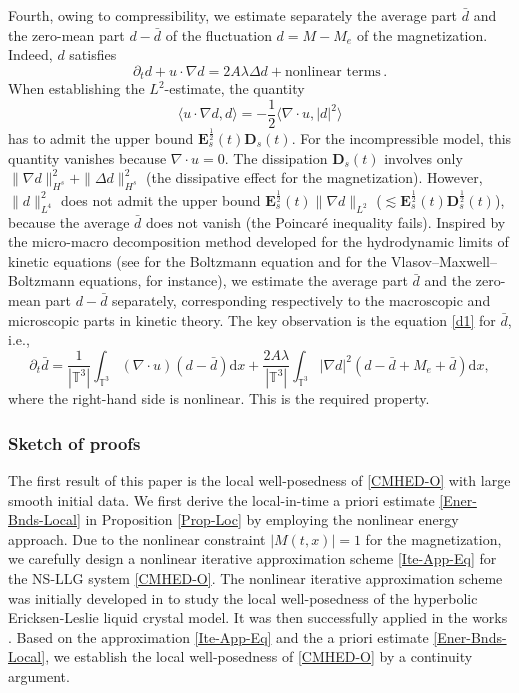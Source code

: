 \documentclass[reqno,11pt]{amsart}
\numberwithin{equation}{section}
\def\d{\mathrm{d}}
\begin{document}
Fourth, owing to compressibility, we estimate separately the average part $\bar{d}$ and the zero-mean part $d-\bar{d}$ of the fluctuation $d = M - M_e$ of the magnetization. Indeed, $d$ satisfies
$$ \partial_{t}d + u \cdot \nabla d = 2A \lambda \Delta d + \text{nonlinear terms} \,. $$
When establishing the $L^{2}$-estimate, the quantity
$$
\langle u \cdot {\nabla} {d}, d \rangle = - \frac{1}{2} \langle {\nabla} \cdot u, |d|^{2} \rangle
$$
has to admit the upper bound $\mathbf{E}_{s}^{\frac{1}{2}}(t) \mathbf{D}_{s} (t)$. For the incompressible model, this quantity vanishes because $\nabla \cdot u = 0$. The dissipation $\mathbf{D}_{s}(t)$ involves only $\| \nabla d \|_{H^s}^{2} + \|\Delta d \|_{H^s}^{2}$ (the dissipative effect for the magnetization). However, $\| d \|_{L^4}^2$ does not admit the upper bound $\mathbf{E}_{s}^{\frac{1}{2}}(t) \| \nabla d \|_{L^2}$ ($\lesssim \mathbf{E}_{s}^{\frac{1}{2}}(t) \mathbf{D}_{s}^{\frac{1}{2}}(t)$), because the average $\bar{d}$ does not vanish (the Poincaré inequality fails). Inspired by the micro-macro decomposition method developed for the hydrodynamic limits of kinetic equations (see \cite{Guo-CPAM-2006} for the Boltzmann equation and \cite{JL-APDE-2022,JLZ-ARMA-2023} for the Vlasov–Maxwell–Boltzmann equations, for instance), we estimate the average part $\bar{d}$ and the zero-mean part $d-\bar{d}$ separately, corresponding respectively to the macroscopic and microscopic parts in kinetic theory. The key observation is the equation \eqref{d1} for $\bar{d}$, i.e.,
$$
\partial_{t} \bar{d}= \frac{1}{| \mathbb{T}^3 |} \int_{\mathbb{T}^3} (\nabla \cdot u)( {d}-\bar{d}) \d x + \frac{ 2 A \lambda }{| \mathbb{T}^3 |} \int_{\mathbb{T}^3} | \nabla d |^{2}(d-\bar{d}+M_e + \bar{d}) \d x,
$$
where the right-hand side is nonlinear. This is the required property.

\subsubsection{Sketch of proofs}

The first result of this paper is the local well-posedness of \eqref{CMHED-O} with large smooth initial data. We first derive the local-in-time a priori estimate \eqref{Ener-Bnds-Local} in Proposition \ref{Prop-Loc} by employing the nonlinear energy approach. Due to the nonlinear constraint $|M(t,x)| = 1$ for the magnetization, we carefully design a nonlinear iterative approximation scheme \eqref{Ite-App-Eq} for the NS-LLG system \eqref{CMHED-O}. The nonlinear iterative approximation scheme was initially developed in \cite{JL-SIMA-2019} to study the local well-posedness of the hyperbolic Ericksen-Leslie liquid crystal model. It was then successfully applied in the works \cite{JLL-JDE-2023, JLT-M3AS-2020}. Based on the approximation \eqref{Ite-App-Eq} and the a priori estimate \eqref{Ener-Bnds-Local}, we establish the local well-posedness of \eqref{CMHED-O} by a continuity argument.
\end{document}
